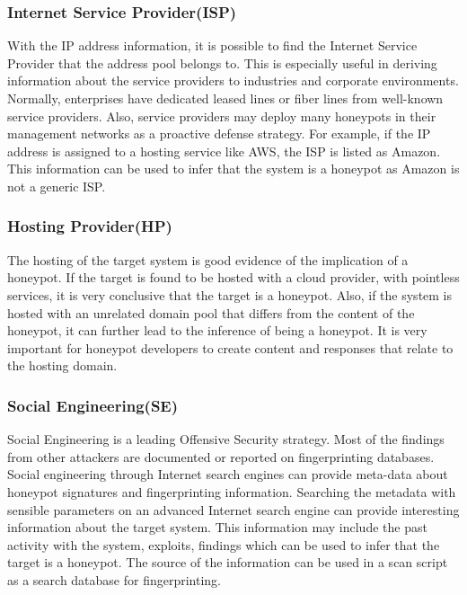 \subsubsection{Internet Service Provider(ISP)}
With the IP address information, it is possible to find the Internet Service Provider that the address pool belongs to. This is especially useful in deriving information about the service providers to industries and corporate environments. Normally, enterprises have dedicated leased lines or fiber lines from well-known service providers. Also, service providers may deploy many honeypots in their management networks as a proactive defense strategy. For example, if the IP address is assigned to a hosting service like AWS, the ISP is listed as Amazon. This information can be used to infer that the system is a honeypot as Amazon is not a generic ISP. 

\subsubsection{Hosting Provider(HP)}
The hosting of the target system is good evidence of the implication of a honeypot. If the target is found to be hosted with a cloud provider, with pointless services, it is very conclusive that the target is a honeypot. Also, if the system is hosted with an unrelated domain pool that differs from the content of the honeypot, it can further lead to the inference of being a honeypot. It is very important for honeypot developers to create content and responses that relate to the hosting domain. 

\subsubsection{Social Engineering(SE)}
Social Engineering is a leading Offensive Security strategy. Most of the findings from other attackers are documented or reported on fingerprinting databases. Social engineering through Internet search engines can provide meta-data about honeypot signatures and fingerprinting information. Searching the metadata with sensible parameters on an advanced Internet search engine can provide interesting information about the target system. This information may include the past activity with the system, exploits, findings which can be used to infer that the target is a honeypot. The source of the information can be used in a scan script as a search database for fingerprinting. 

